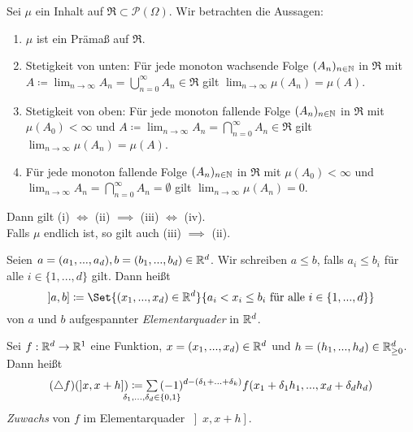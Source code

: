 \documentclass{cheat-sheet}
\newcommand{\Ring}{\mathfrak{R}} %
\begin{document}
\begin{satz}
  Sei $\mu$ ein Inhalt auf $\Ring \subset \mathcal{P}(\Omega)$. Wir betrachten die Aussagen:

  \begin{enumerate}[label=(\roman*),leftmargin=2em]
    \item $\mu$ ist ein Prämaß auf $\Ring$.
    \item Stetigkeit von unten: Für jede monoton wachsende Folge $(A_n)_{n \in \mathbb{N}}$ in $\Ring$ mit $A \coloneqq \lim_{n \to \infty} A_n = \bigcup_{n = 0}^\infty A_n \in \Ring$ gilt $\lim_{n \to \infty} \mu(A_n) = \mu(A)$.
    \item Stetigkeit von oben: Für jede monoton fallende Folge $(A_n)_{n \in \mathbb{N}}$ in $\Ring$ mit $\mu(A_0) < \infty$ und $A \coloneqq \lim_{n \to \infty} A_n = \bigcap_{n = 0}^\infty A_n \in \Ring$ gilt $\lim_{n \to \infty} \mu(A_n) = \mu(A)$.
    \item Für jede monoton fallende Folge $(A_n)_{n \in \mathbb{N}}$ in $\Ring$ mit $\mu(A_0) < \infty$ und $\lim_{n \to \infty} A_n = \bigcap_{n = 0}^\infty A_n = \emptyset$ gilt $\lim_{n \to \infty} \mu(A_n) = 0$.
  \end{enumerate}

  Dann gilt (i) $\iff$ (ii) $\implies$ (iii) $\iff$ (iv).\\
  Falls $\mu$ endlich ist, so gilt auch (iii) $\implies$ (ii).
\end{satz}


\begin{defn}
  Seien $a = (a_1, ..., a_d), b = (b_1, ..., b_d) \in \mathbb{R}^d$. Wir schreiben $a \leq b$, falls $a_i \leq b_i$ für alle $i \in \{ 1, ..., d \}$ gilt. Dann heißt
  \[ \left] a, b \right] \coloneqq \Set{ (x_1, ..., x_d) \in \R^d }{ a_i < x_i \leq b_i \text{ für alle } i \in \{ 1, ..., d \} } \]
  von $a$ und $b$ aufgespannter \emph{Elementarquader} in $\mathbb{R}^d$.
\end{defn}

\begin{defn}
  Sei $f : \mathbb{R}^d \to \mathbb{R}^1$ eine Funktion, $x = (x_1, ..., x_d) \in \mathbb{R}^d$ und $h = (h_1, ..., h_d) \in \mathbb{R}_{\geq 0}^d$. Dann heißt
  \[ (\triangle f)(\left] x, x + h \right]) \coloneqq \sum_{\mathclap{\delta_1, ..., \delta_d \in \{0,1\}}} \, (-1)^{d-(\delta_1 + ... + \delta_k)} f(x_1 + \delta_1 h_1, ..., x_d + \delta_d h_d) \]
  \emph{Zuwachs} von $f$ im Elementarquader $\left] x, x+h \right]$.
\end{defn}
\end{document}
